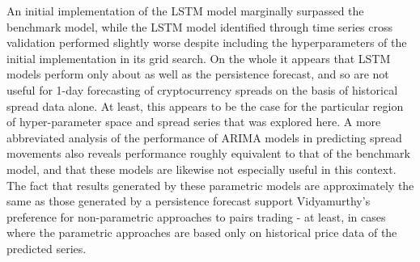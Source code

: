\documentclass{article}
\begin{document}
An initial implementation of the LSTM model marginally surpassed the benchmark model, while the LSTM model identified through time series cross validation performed slightly worse despite including the hyperparameters of the initial implementation in its grid search. On the whole it appears that LSTM models perform only about as well as the persistence forecast, and so are not useful for 1-day forecasting of cryptocurrency spreads on the basis of historical spread data alone. At least, this appears to be the case for the particular region of hyper-parameter space and spread series that was explored here. A more abbreviated analysis of the performance of ARIMA models in predicting spread movements also reveals performance roughly equivalent to that of the benchmark model, and that these models are likewise not especially useful in this context. The fact that results generated by these parametric models are approximately the same as those generated by a persistence forecast support Vidyamurthy's preference for non-parametric approaches to pairs trading - at least, in cases where the parametric approaches are based only on historical price data of the predicted series. 







\end{document}
